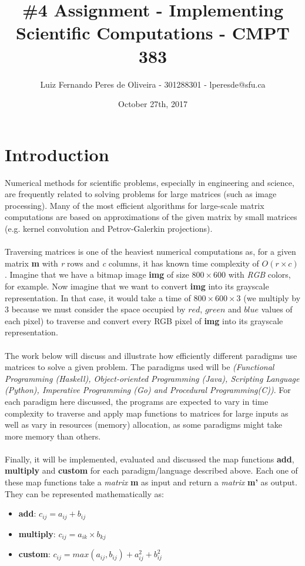\documentclass[conference]{IEEEtran}
\title{\#4 Assignment - Implementing Scientific Computations - CMPT 383}
\author{Luiz Fernando Peres de Oliveira - 301288301 - lperesde@sfu.ca}
\date{October 27th, 2017}
\begin{document}
\maketitle
\section{Introduction}
Numerical methods for scientific problems, especially in engineering and science, are frequently related to solving problems for large matrices (such as image processing). Many of the most efficient algorithms for large-scale matrix computations are based on approximations of the given matrix by small matrices (e.g. kernel convolution and Petrov-Galerkin projections).
\\\\
Traversing matrices is one of the heaviest numerical computations as, for a given matrix \textbf{m} with \textit{r} rows and \textit{c} columns, it has known time complexity of $O(r\times c)$. Imagine that we have a bitmap image \textbf{img} of size $800 \times 600$ with \textit{RGB} colors, for example. Now imagine that we want to convert \textbf{img} into its grayscale representation.  In that case, it would take a time of $800 \times 600 \times 3$ (we multiply by 3 because we must consider the space occupied by $red$, $green$ and $blue$ values of each pixel) to traverse and convert every RGB pixel of \textbf{img} into its grayscale representation.
\\\\
The work below will discuss and illustrate how efficiently different paradigms use matrices to solve a given problem. The paradigms used will be \textit{(Functional Programming (Haskell), Object-oriented Programming (Java), Scripting Language (Python), Imperative Programming (Go) and Procedural Programming(C))}. For each paradigm here discussed, the programs are expected to vary in time complexity to traverse and apply map functions to matrices for large inputs as well as vary in resources (memory) allocation, as some paradigms might take more memory than others.
\\\\
Finally, it will be implemented, evaluated and discussed the map functions \textbf{add}, \textbf{multiply} and \textbf{custom} for each paradigm/language described above. Each one of these map functions take a \textit{matrix} \textbf{m} as input and return a \textit{matrix} \textbf{m'} as output. They can be represented mathematically as:

\begin{itemize}
	\item \textbf{add}: $c_{ij} = a_{ij} + b_{ij}$
	\item \textbf{multiply}: $c_{ij} = a_{ik} \times b_{kj}$
	\item \textbf{custom}: $c_{ij} = max(a_{ij}, b_{ij}) + a_{ij}^2 + b_{ij}^2$
\end{itemize}
\end{document}
